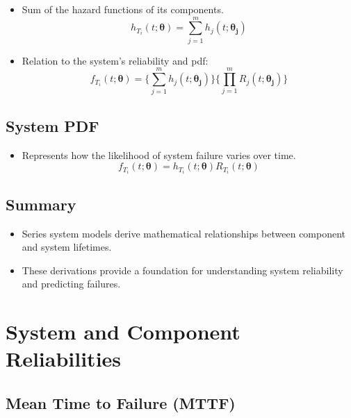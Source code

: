 \documentclass[]{tufte-book}
\providecommand{\tightlist}{%
  \setlength{\itemsep}{0pt}\setlength{\parskip}{0pt}}
\theoremstyle{definition}
\theoremstyle{plain}
\begin{document}
\begin{itemize}
\tightlist
\item
  Sum of the hazard functions of its components.
  \[ h_{T_i}(t;\boldsymbol{\theta}) = \sum_{j=1}^m h_j(t;\boldsymbol{\theta_j}) \]
\item
  Relation to the system's reliability and pdf:
  \[ f_{T_i}(t;\boldsymbol{\theta}) = \biggl\{\sum_{j=1}^m h_j(t;\boldsymbol{\theta_j})\biggr\} \biggl\{ \prod_{j=1}^m R_j(t;\boldsymbol{\theta_j}) \biggr\} \]
\end{itemize}

\hypertarget{system-pdf}{%
\section{System PDF}\label{system-pdf}}

\begin{itemize}
\tightlist
\item
  Represents how the likelihood of system failure varies over time.
  \[ f_{T_i}(t;\boldsymbol{\theta}) = h_{T_i}(t;\boldsymbol{\theta}) R_{T_i}(t;\boldsymbol{\theta}) \]
\end{itemize}

\hypertarget{summary}{%
\section{Summary}\label{summary}}

\begin{itemize}
\tightlist
\item
  Series system models derive mathematical relationships between component and system lifetimes.
\item
  These derivations provide a foundation for understanding system reliability and predicting failures.
\end{itemize}

\hypertarget{system-and-component-reliabilities}{%
\chapter{System and Component Reliabilities}\label{system-and-component-reliabilities}}

\hypertarget{mean-time-to-failure-mttf}{%
\section{Mean Time to Failure (MTTF)}\label{mean-time-to-failure-mttf}}
\end{document}
